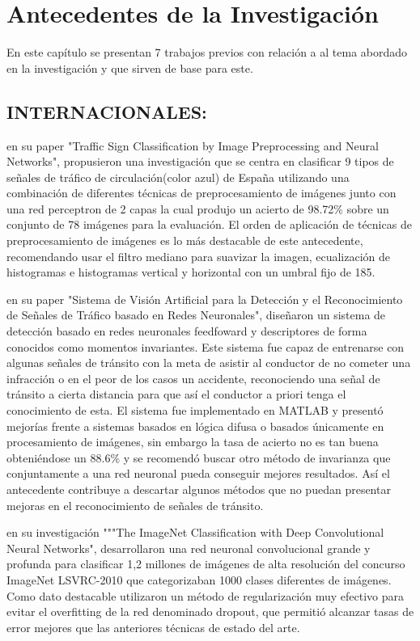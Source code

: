 \section{Antecedentes de la Investigación}

	En este capítulo se presentan 7 trabajos previos con relación a al tema abordado en la investigación y que sirven de base para este.
	\vskip 0.4cm

	\subsection
	{INTERNACIONALES:}
		\citep{VicenBueno2007} en su paper "Traffic Sign Classification by Image Preprocessing and Neural Networks", propusieron una investigación que se centra en clasificar 9 tipos de señales de tráfico de circulación(color azul) de España utilizando una combinación de diferentes técnicas de preprocesamiento de imágenes junto con una red perceptron de 2 capas la cual produjo un acierto de 98.72\% sobre un conjunto de 78 imágenes para la evaluación. El orden de aplicación de técnicas de preprocesamiento de imágenes es lo más destacable de este antecedente, recomendando usar el filtro mediano para suavizar la imagen, ecualización de histogramas e histogramas vertical y horizontal con un umbral fijo de 185.
		\vskip 0.4cm

		\citep{Rocha2010} en su paper "Sistema de Visión Artificial para la Detección y el Reconocimiento de Señales de Tráfico basado en Redes Neuronales", diseñaron un sistema de detección basado en redes neuronales feedfoward y descriptores de forma conocidos como momentos invariantes. Este sistema fue capaz de entrenarse con algunas señales de tránsito con la meta de asistir al conductor de no cometer una infracción o en el peor de los casos un accidente, reconociendo una señal de tránsito a cierta distancia para que así el conductor a priori tenga el conocimiento de esta. El sistema fue implementado en MATLAB y presentó mejorías frente a sistemas basados en lógica difusa o basados únicamente en procesamiento de imágenes, sin embargo la tasa de acierto no es tan buena obteniéndose un 88.6\% y se recomendó buscar otro método de invarianza que conjuntamente a una red neuronal pueda conseguir mejores resultados. Así el antecedente contribuye a descartar algunos métodos que no puedan presentar mejoras en el reconocimiento de señales de tránsito.
		\vskip 0.4cm

		\citep{Krizhevsky2012} en su investigación """The ImageNet Classification with Deep Convolutional Neural Networks", desarrollaron una red neuronal convolucional grande y profunda para clasificar 1,2 millones de imágenes de alta resolución del concurso ImageNet LSVRC-2010 que categorizaban 1000 clases diferentes de imágenes. Como dato destacable utilizaron un método de regularización muy efectivo para evitar el overfitting de la red denominado dropout, que permitió alcanzar tasas de error mejores que las anteriores técnicas de estado del arte.
		\vskip 0.4cm	

